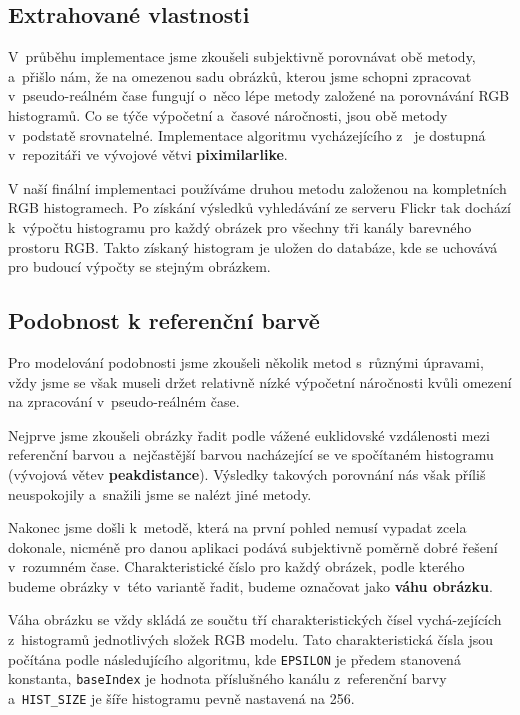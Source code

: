 \documentclass[12pt,oneside,a4paper]{article}
\begin{document}
\subsection{Extrahované vlastnosti}

V~průběhu implementace jsme zkoušeli subjektivně porovnávat obě metody, a~přišlo nám, že na omezenou sadu obrázků, kterou jsme schopni zpracovat v~pseudo-reálném čase fungují o~něco lépe metody založené na porovnávání RGB histogramů. Co se týče výpočetní a~časové náročnosti, jsou obě metody v~podstatě srovnatelné. Implementace algoritmu vycházejícího z~\cite{Mueller2k9} je dostupná v~repozitáři \cite{official} ve vývojové větvi \textbf{piximilarlike}.

V naší finální implementaci používáme druhou metodu založenou na kompletních RGB histogramech. Po získání výsledků vyhledávání ze serveru Flickr tak dochází k~výpočtu histogramu pro každý obrázek pro všechny tři kanály barevného prostoru RGB. Takto získaný histogram je uložen do databáze, kde se uchovává pro budoucí výpočty se stejným obrázkem.

\subsection{Podobnost k referenční barvě}
\label{sec:podobnost}

Pro modelování podobnosti jsme zkoušeli několik metod s~různými úpravami, vždy jsme se však museli držet relativně nízké výpočetní náročnosti kvůli omezení na zpracování v~pseudo-reálném čase.

Nejprve jsme zkoušeli obrázky řadit podle vážené euklidovské vzdálenosti mezi referenční barvou a~nejčastější barvou nacházející se ve spočítaném histogramu (vývojová větev \textbf{peakdistance}). Výsledky takových porovnání nás však příliš neuspokojily a~snažili jsme se nalézt jiné metody.

Nakonec jsme došli k~metodě, která na první pohled nemusí vypadat zcela dokonale, nicméně pro danou aplikaci podává subjektivně poměrně dobré řešení v~rozumném čase. Charakteristické číslo pro každý obrázek, podle kterého budeme obrázky v~této variantě řadit, budeme označovat jako \textbf{váhu obrázku}.

Váha obrázku se vždy skládá ze součtu tří charakteristických čísel vychá-zejících z~histogramů jednotlivých složek RGB modelu. Tato charakteristická čísla jsou počítána podle následujícího algoritmu, kde \texttt{EPSILON} je předem stanovená konstanta, \texttt{baseIndex} je hodnota příslušného kanálu z~referenční barvy a~\texttt{HIST\_SIZE} je šíře histogramu pevně nastavená na 256.
\end{document}
